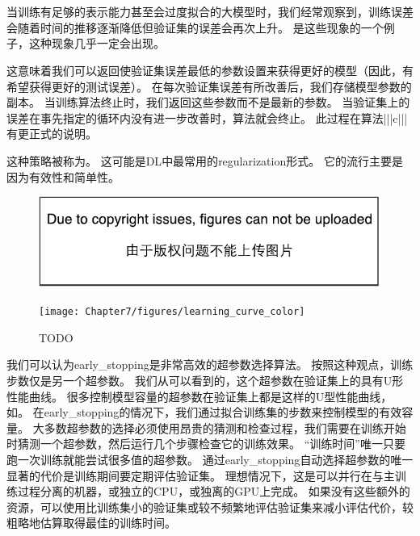 
\section{}
\label{sec:early_stopping}
当训练有足够的表示能力甚至会过度拟合的大模型时，我们经常观察到，训练误差会随着时间的推移逐渐降低但验证集的误差会再次上升。
是这些现象的一个例子，这种现象几乎一定会出现。

这意味着我们可以返回使验证集误差最低的参数设置来获得更好的模型（因此，有希望获得更好的测试误差）。
在每次验证集误差有所改善后，我们存储模型参数的副本。
当训练算法终止时，我们返回这些参数而不是最新的参数。
当验证集上的误差在事先指定的循环内没有进一步改善时，算法就会终止。
此过程在算法|||c|||有更正式的说明。


这种策略被称为。
这可能是\gls{DL}中最常用的\gls{regularization}形式。
它的流行主要是因为有效性和简单性。

\begin{figure}[!htb]
\ifOpenSource
\centerline{\includegraphics{figure.pdf}}
\else
\centerline{\texttt{[image: Chapter7/figures/learning\_curve\_color]}}
\fi
\caption{TODO}
\label{fig:chap7_learning_curve}
\end{figure}

我们可以认为\gls{early_stopping}是非常高效的超参数选择算法。
按照这种观点，训练步数仅是另一个超参数。
我们从可以看到的，这个超参数在验证集上的具有U形性能曲线。
很多控制模型容量的超参数在验证集上都是这样的U型性能曲线，如。
在\gls{early_stopping}的情况下，我们通过拟合训练集的步数来控制模型的有效容量。
大多数超参数的选择必须使用昂贵的猜测和检查过程，我们需要在训练开始时猜测一个超参数，然后运行几个步骤检查它的训练效果。
``训练时间''唯一只要跑一次训练就能尝试很多值的超参数。
通过\gls{early_stopping}自动选择超参数的唯一显著的代价是训练期间要定期评估验证集。
理想情况下，这是可以并行在与主训练过程分离的机器，或独立的CPU，或独离的GPU上完成。
如果没有这些额外的资源，可以使用比训练集小的验证集或较不频繁地评估验证集来减小评估代价，较粗略地估算取得最佳的训练时间。

